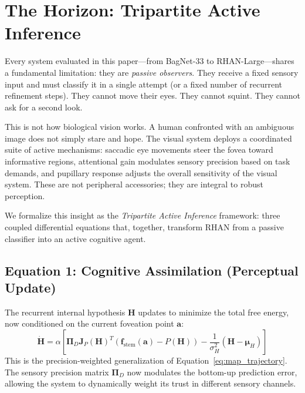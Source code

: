 \documentclass[12pt,a4paper]{article}
\begin{document}
\section{The Horizon: Tripartite Active Inference}
\label{sec:active_inference}

Every system evaluated in this paper---from BagNet-33 to RHAN-Large---shares
a fundamental limitation: they are \textit{passive observers}. They receive
a fixed sensory input and must classify it in a single attempt (or a fixed
number of recurrent refinement steps). They cannot move their eyes. They
cannot squint. They cannot ask for a second look.

This is not how biological vision works. A human confronted with an ambiguous
image does not simply stare and hope. The visual system deploys a coordinated
suite of active mechanisms: saccadic eye movements steer the fovea toward
informative regions, attentional gain modulates sensory precision based on
task demands, and pupillary response adjusts the overall sensitivity of the
visual system. These are not peripheral accessories; they are integral to
robust perception.

We formalize this insight as the \textit{Tripartite Active Inference}
framework: three coupled differential equations that, together, transform
RHAN from a passive classifier into an active cognitive agent.

\subsection{Equation 1: Cognitive Assimilation (Perceptual Update)}

The recurrent internal hypothesis $\mathbf{H}$ updates to minimize the
total free energy, now conditioned on the current foveation point
$\mathbf{a}$:
\begin{equation}
  \dot{\mathbf{H}} = \alpha \left[
  \bm{\Pi}_D \mathbf{J}_P(\mathbf{H})^T
  \left( \mathbf{f}_{\mathrm{stem}}(\mathbf{a}) - P(\mathbf{H}) \right)
  - \frac{1}{\sigma_H^2} (\mathbf{H} - \bm{\mu}_H)
  \right]
  \label{eq:active_perception}
\end{equation}
This is the precision-weighted generalization of Equation~\ref{eq:map_trajectory}.
The sensory precision matrix $\bm{\Pi}_D$ now modulates the bottom-up
prediction error, allowing the system to dynamically weight its trust in
different sensory channels.
\end{document}
